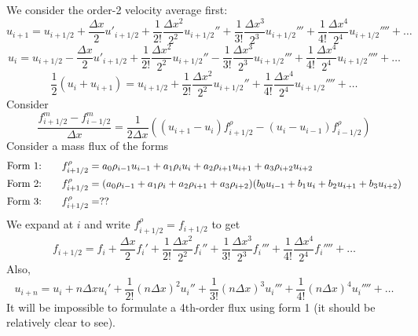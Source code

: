 \documentclass[12pt]{article}
\numberwithin{equation}{section}
\numberwithin{figure}{section}
\begin{document}
We consider the order-2 velocity average first:
\begin{equation}
u_{i+1} = u_{i+1/2}
+ \frac{\Delta x}{2}u'_{i+1/2}
+ \frac{1}{2!}\frac{\Delta x^2}{2^2}u_{i+1/2}''
+ \frac{1}{3!}\frac{\Delta x^3}{2^3}u_{i+1/2}'''
+ \frac{1}{4!}\frac{\Delta x^4}{2^4}u_{i+1/2}'''' + \dots
\end{equation}
\begin{equation}
u_{i} = u_{i+1/2}
- \frac{\Delta x}{2}u'_{i+1/2}
+ \frac{1}{2!}\frac{\Delta x^2}{2^2}u_{i+1/2}''
- \frac{1}{3!}\frac{\Delta x^3}{2^3}u_{i+1/2}'''
+ \frac{1}{4!}\frac{\Delta x^4}{2^4}u_{i+1/2}'''' + \dots
\end{equation}
\begin{equation}
\frac{1}{2}(u_i + u_{i+1}) = u_{i+1/2} + \frac{1}{2!}\frac{\Delta x^2}{2^2}u_{i+1/2}'' + \frac{1}{4!}\frac{\Delta x^4}{2^4}u_{i+1/2}'''' + \dots
\end{equation}
Consider
\begin{equation}
\frac{f^m_{i+1/2} - f^m_{i-1/2}}{\Delta x} = \frac{1}{2\Delta x}\left((u_{i+1}-u_{i})f^\rho_{i+1/2} - (u_{i}-u_{i-1})f^\rho_{i-1/2}\right)
\end{equation}
Consider a mass flux of the forms
\begin{align}
\textrm{Form 1:\hspace{7mm}}&f^\rho_{i+1/2} = a_0\rho_{i-1}u_{i-1} + a_1\rho_{i}u_{i} + a_2\rho_{i+1}u_{i+1} + a_3\rho_{i+2}u_{i+2} \\
\textrm{Form 2:\hspace{7mm}}&f^\rho_{i+1/2} = (a_0\rho_{i-1}+a_1\rho_{i}+a_2\rho_{i+1}+a_3\rho_{i+2})(b_0u_{i-1}+b_1u_{i}+b_2u_{i+1}+b_3u_{i+2}) \\
\textrm{Form 3:\hspace{7mm}}&f^\rho_{i+1/2} = ??
\end{align}
We expand at $i$ and write $f^\rho_{i+1/2} = f_{i+1/2}$ to get
\begin{equation}
f_{i+1/2} = f_{i} + \frac{\Delta x}{2}f_{i}' + \frac{1}{2!}\frac{\Delta x^2}{2^2}f_{i}'' + \frac{1}{3!}\frac{\Delta x^3}{2^3}f_{i}''' + \frac{1}{4!}\frac{\Delta x^4}{2^4}f_{i}'''' + \dots
\end{equation}
Also,
\begin{equation}
u_{i+n} = u_i + n\Delta x u_i' + \frac{1}{2!}\left(n\Delta x\right)^2 u_i'' + \frac{1}{3!}\left(n\Delta x\right)^3 u_i''' + \frac{1}{4!}\left(n\Delta x\right)^4 u_i'''' + \dots
\end{equation}
It will be impossible to formulate a 4th-order flux using form 1 (it should be relatively clear to see).
\end{document}
